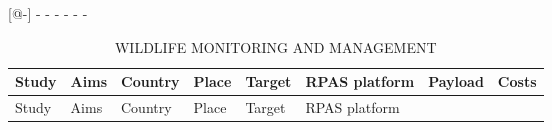 \documentclass[]{interact}
\theoremstyle{plain}%
\theoremstyle{definition}
\theoremstyle{remark}
\begin{document}
{[}@-{]} \textbar{} - \textbar{} - \textbar{} - \textbar{} - \textbar{}
- \textbar{} \textbar{} - \textbar{}

\begin{longtable}[]{@{}llllllll@{}}
\caption{WILDLIFE MONITORING AND MANAGEMENT}\tabularnewline
\toprule
\begin{minipage}[b]{0.11\columnwidth}\raggedright\strut
Study\strut
\end{minipage} & \begin{minipage}[b]{0.18\columnwidth}\raggedright\strut
Aims\strut
\end{minipage} & \begin{minipage}[b]{0.03\columnwidth}\raggedright\strut
Country\strut
\end{minipage} & \begin{minipage}[b]{0.14\columnwidth}\raggedright\strut
Place\strut
\end{minipage} & \begin{minipage}[b]{0.10\columnwidth}\raggedright\strut
Target\strut
\end{minipage} & \begin{minipage}[b]{0.09\columnwidth}\raggedright\strut
RPAS platform\strut
\end{minipage} & \begin{minipage}[b]{0.11\columnwidth}\raggedright\strut
Payload\strut
\end{minipage} & \begin{minipage}[b]{0.01\columnwidth}\raggedright\strut
Costs\strut
\end{minipage}\tabularnewline
\midrule
\endfirsthead
\toprule
\begin{minipage}[b]{0.11\columnwidth}\raggedright\strut
Study\strut
\end{minipage} & \begin{minipage}[b]{0.18\columnwidth}\raggedright\strut
Aims\strut
\end{minipage} & \begin{minipage}[b]{0.03\columnwidth}\raggedright\strut
Country\strut
\end{minipage} & \begin{minipage}[b]{0.14\columnwidth}\raggedright\strut
Place\strut
\end{minipage} & \begin{minipage}[b]{0.10\columnwidth}\raggedright\strut
Target\strut
\end{minipage} & \begin{minipage}[b]{0.09\columnwidth}\raggedright\strut
RPAS platform\strut

\end{minipage}
\end{longtable}
\end{document}
